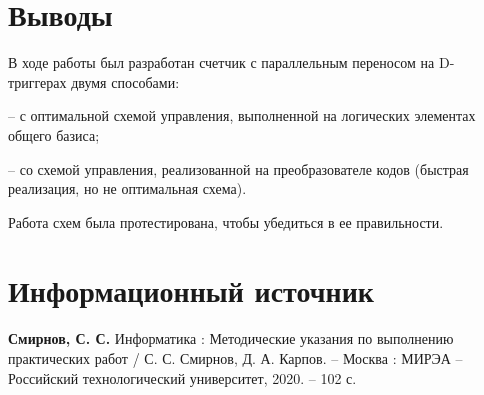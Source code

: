 \documentclass[14pt, a4paper]{extreport}
\begin{document}
\chapter{Выводы}
В ходе работы был разработан счетчик с параллельным переносом на D-триггерах двумя способами:

-- с оптимальной схемой управления, выполненной на логических элементах общего базиса;

-- со схемой управления, реализованной на преобразователе кодов (быстрая реализация, но не оптимальная схема).

Работа схем была протестирована, чтобы убедиться в ее правильности.

\chapter{Информационный источник}
\textbf{Смирнов, С. С.} Информатика : Методические указания по выполнению практических работ / С. С. Смирнов, Д. А. Карпов. -- Москва : МИРЭА -- Российский технологический университет, 2020. -- 102 с.
\end{document}

